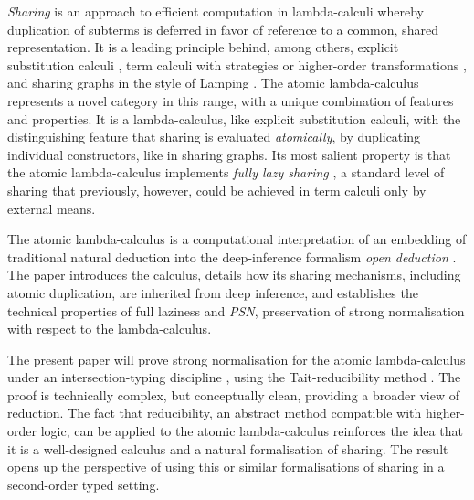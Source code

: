 \documentclass{llncs} %
\begin{document}
\emph{Sharing} is an approach to efficient computation in lambda-calculi whereby duplication of subterms is deferred in favor of reference to a common, shared representation.
%
It is a leading principle behind, among others, explicit substitution calculi \cite{Abadi-Cardelli-Curien-Levy-1991,Lescanne-1994,David-Guillaume-2001,DiCosmo-Kesner-Polonovski-2003,Kesner-Lengrand-2007,Accattoli-Kesner-2010}, term calculi with strategies or higher-order transformations \cite{Hughes-1982,Ariola-Felleisen-Maraist-Odersky-Wadler-1995}, and sharing graphs in the style of Lamping \cite{Lamping-1990,Asperti-Guerrini-1998,VanOostrom-VanDeLooij-Zwitserlood-2004}.
%
The atomic lambda-calculus represents a novel category in this range, with a unique combination of features and properties.
%
It is a lambda-calculus, like explicit substitution calculi, with the distinguishing feature that sharing is evaluated \emph{atomically}, by duplicating individual constructors, like in sharing graphs.
%
Its most salient property is that the atomic lambda-calculus implements \emph{fully lazy sharing} \cite{Wadsworth-1971,Hughes-1982,Balabonski-2012}, a standard level of sharing that previously, however, could be achieved in term calculi only by external means.



The atomic lambda-calculus is a computational interpretation of an embedding of traditional natural deduction into the deep-inference formalism \emph{open deduction} \cite{Guglielmi-Gundersen-Parigot-2010}.
%
The paper \cite{Gundersen-Heijltjes-Parigot-2013-LICS} introduces the calculus, details how its sharing mechanisms, including atomic duplication, are inherited from deep inference, and establishes the technical properties of full laziness and \emph{PSN}, preservation of strong normalisation with respect to the lambda-calculus.



The present paper will prove strong normalisation for the atomic lambda-calculus under an intersection-typing discipline \cite{Coppo-DezaniCiancaglini-1980,Pottinger-1980,Krivine-1993}, using the Tait-reducibility method \cite{Tait-1967,ProofsAndTypes}.
%
The proof is technically complex, but conceptually clean, providing a broader view of reduction.
%
The fact that reducibility, an abstract method compatible with higher-order logic, can be applied to the atomic lambda-calculus reinforces the idea that it is a well-designed calculus and a natural formalisation of sharing.
%
The result opens up the perspective of using this or similar formalisations of sharing in a second-order typed setting.
\end{document}
